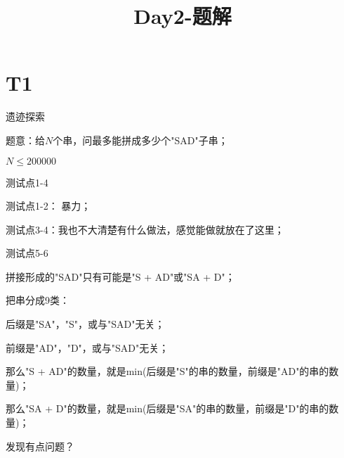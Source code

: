 \documentclass{beamer}
\title{Day2-题解}
\author{}
\institute{}
\begin{document}
\begin{frame}
	\maketitle
\end{frame}

\section{T1}
\begin{frame}{遗迹探索}

	\par 题意：给$N$个串，问最多能拼成多少个"SAD"子串；

	\par $N \leq 200000$

\end{frame}

\begin{frame}{测试点1-4}

	\par 测试点1-2： 暴力；

	\pause

	\par 测试点3-4：我也不大清楚有什么做法，感觉能做就放在了这里；

\end{frame}

\begin{frame}{测试点5-6}

	\par 拼接形成的"SAD"只有可能是"S + AD"或"SA + D"；

	\pause

	\par 把串分成9类：

	\par 后缀是"SA"，"S"，或与"SAD"无关；

	\par 前缀是"AD"，"D"，或与"SAD"无关；

	\pause

	\par 那么"S + AD"的数量，就是min(后缀是"S"的串的数量，前缀是"AD"的串的数量)；

	\par 那么"SA + D"的数量，就是min(后缀是"SA"的串的数量，前缀是"D"的串的数量)；

	\pause

	\par 发现有点问题？

\end{frame}
\end{document}
